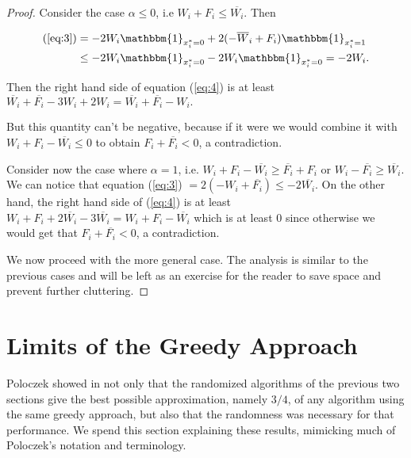 \documentclass[11pt,letter]{article}
\numberwithin{theorem}{section}
\begin{document}
\begin{proof}
Consider the case $\alpha \leq 0$, i.e $W_i + F_i \leq \overline{W_i}$. Then

\begin{equation*}
\begin{aligned}
(\ref{eq:3}) & = -2W_i \mathbbm{1}_{x_i^* = 0} + 2(-\overline{W}_i + F_i) \mathbbm{1}_{x_i^* = 1} \\ 
& \leq  -2W_i \mathbbm{1}_{x_i^* = 0} - 2W_i \mathbbm{1}_{x_i^* = 0} = -2W_i.
\end{aligned}
\end{equation*}

Then the right hand side of equation (\ref{eq:4}) is at least $\overline{W_i} + \overline{F_i} - 3W_i + 2W_i =
\overline{W_i} + \overline{F_i} - W_i.$

But this quantity can't be negative, because if it were we would combine it with $W_i + F_i - \overline{W_i} \leq 0$ to obtain $F_i +
\overline{F_i} < 0$, a contradiction.

Consider now the case where $\alpha = 1$, i.e. $W_i + F_i -\overline{W_i} \geq \overline{F_i} + F_i$ or $W_i - \overline{F_i} \geq \overline{W_i}$.
We can notice that equation (\ref{eq:3}) $= 2(-W_i + \overline{F_i}) \leq -2\overline{W_i}$. On the other hand, the right hand side of  (\ref{eq:4})
is at least $W_i + F_i + 2\overline{W_i} -3\overline{W_i} = W_i + F_i - \overline{W_i}$ which is at least $0$ since otherwise we would get
that $F_i + \overline{F_i} < 0$, a contradiction.

We now proceed with the more general case. The analysis is similar to the previous cases and will be left as an exercise
for the reader to save space and prevent further cluttering.
\end{proof}


\section{Limits of the Greedy Approach}\label{S:limits}

Poloczek showed in \cite{DBLP:conf/esa/Poloczek11} not only that
the randomized algorithms of the previous two sections
give the best possible approximation, namely $3/4$,
of any algorithm using the same greedy approach,
but also that the randomness was necessary for that performance.
We spend this section explaining these results,
mimicking much of Poloczek's notation and terminology.
\end{document}
